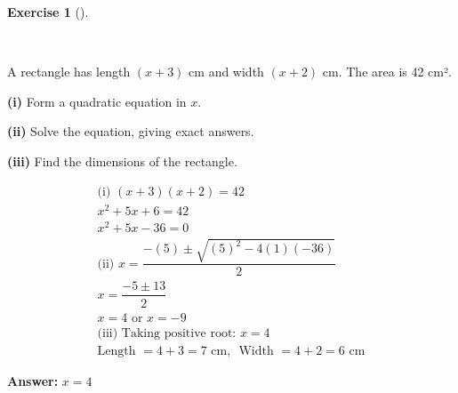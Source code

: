 \documentclass[
  letterpaper,
  DIV=11,
  numbers=noendperiod]{scrreprt}
\theoremstyle{definition}
\newtheorem{exercise}{Exercise}[chapter]
\theoremstyle{remark}
\begin{document}
\begin{exercise}[]\protect\hypertarget{exr-u6-18-1}{}\label{exr-u6-18-1}

~

A rectangle has length \((x + 3)\) cm and width \((x + 2)\) cm. The area
is 42 cm².

\textbf{(i)} Form a quadratic equation in \(x\).

\textbf{(ii)} Solve the equation, giving exact answers.

\textbf{(iii)} Find the dimensions of the rectangle.

\begin{tcolorbox}[enhanced jigsaw, opacitybacktitle=0.6, coltitle=black, arc=.35mm, colframe=quarto-callout-tip-color-frame, colback=white, bottomrule=.15mm, left=2mm, colbacktitle=quarto-callout-tip-color!10!white, titlerule=0mm, opacityback=0, title=\textcolor{quarto-callout-tip-color}{\faLightbulb}\hspace{0.5em}{🔍 View Solution}, leftrule=.75mm, breakable, rightrule=.15mm, bottomtitle=1mm, toptitle=1mm, toprule=.15mm]

\begin{align*}
\text{(i) } (x + 3)(x + 2) = 42 \\ x^2 + 5x + 6 = 42 \\ x^2 +5x - 36 = 0 \\ \text{(ii) } x = \dfrac{-(5) \pm \sqrt{(5)^2 - 4(1)(-36)}}{2} \\ x = \dfrac{-5 \pm 13}{2} \\ x = 4 \text{ or } x = -9 \\ \text{(iii) Taking positive root: } x = 4 \\ \text{Length } = 4 + 3 = 7 \text{ cm, }\text{ Width } = 4 + 2 = 6 \text{ cm}
\end{align*}

\textbf{Answer:} \(x = 4\)

\end{tcolorbox}

\end{exercise}
\end{document}
